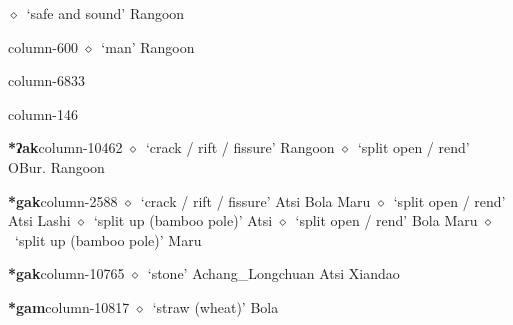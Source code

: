          $\diamond$~`safe and sound'
         Rangoon 
  \item {\footnotesize \textbf{}}{\tiny column-600}
         $\diamond$~`man'
         Rangoon 
  \item {\footnotesize \textbf{}}{\tiny column-6833}
  \item {\footnotesize \textbf{}}{\tiny column-146}
  \item {\footnotesize \textbf{*ʔak}}{\tiny column-10462}
         $\diamond$~`crack / rift / fissure'
         Rangoon 
\hspace{1ex}
         $\diamond$~`split open / rend'
         OBur. 
\hspace{1ex}
         Rangoon 
  \item {\footnotesize \textbf{*gak}}{\tiny column-2588}
         $\diamond$~`crack / rift / fissure'
         Atsi 
\hspace{1ex}
         Bola 
\hspace{1ex}
         Maru 
\hspace{1ex}
         $\diamond$~`split open / rend'
         Atsi 
\hspace{1ex}
         Lashi 
\hspace{1ex}
         $\diamond$~`split up (bamboo pole)'
         Atsi 
\hspace{1ex}
         $\diamond$~`split open / rend'
         Bola 
\hspace{1ex}
         Maru 
\hspace{1ex}
         $\diamond$~`split up (bamboo pole)'
         Maru 
  \item {\footnotesize \textbf{*gak}}{\tiny column-10765}
         $\diamond$~`stone'
         Achang\_Longchuan 
\hspace{1ex}
         Atsi 
\hspace{1ex}
         Xiandao 
  \item {\footnotesize \textbf{*gam}}{\tiny column-10817}
         $\diamond$~`straw (wheat)'
         Bola 
